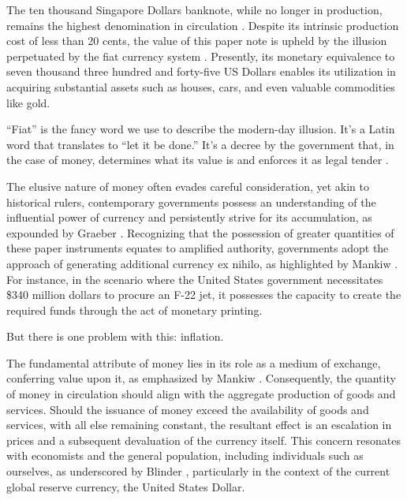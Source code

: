 The ten thousand Singapore Dollars banknote, while no longer in production, remains the highest denomination in circulation \cite{goodhart1998}.
Despite its intrinsic production cost of less than 20 cents, the value of this paper note is upheld by the illusion perpetuated by the fiat
currency system \cite{gupta2019}. Presently, its monetary equivalence to seven thousand three hundred and forty-five US Dollars enables its
utilization in acquiring substantial assets such as houses, cars, and even valuable commodities like gold.

“Fiat” is the fancy word we use to describe the modern-day illusion. It's a Latin word that translates to “let it be done.” It's a decree by the
government that, in the case of money, determines what its value is and enforces it as legal tender \cite{reinhart2018, friedman2000}.

The elusive nature of money often evades careful consideration, yet akin to historical rulers, contemporary governments possess an understanding of the influential power of currency and persistently strive for its accumulation, as expounded by Graeber \cite{graeber2011}. Recognizing that the possession of greater quantities of these paper instruments equates to amplified authority, governments adopt the approach of generating additional currency ex nihilo, as highlighted by Mankiw \cite{mankiw2014}. For instance, in the scenario where the United States government necessitates \$340 million dollars to procure an F-22 jet, it possesses the capacity to create the required funds through the act of monetary printing.

But there is one problem with this: inflation.

The fundamental attribute of money lies in its role as a medium of exchange, conferring value upon it, as emphasized by Mankiw \cite{mankiw2014}. Consequently, the quantity of money in circulation should align with the aggregate production of goods and services. Should the issuance of money exceed the availability of goods and services, with all else remaining constant, the resultant effect is an escalation in prices and a subsequent devaluation of the currency itself. This concern resonates with economists and the general population, including individuals such as ourselves, as underscored by Blinder \cite{blinder2010}, particularly in the context of the current global reserve currency, the United States Dollar.

